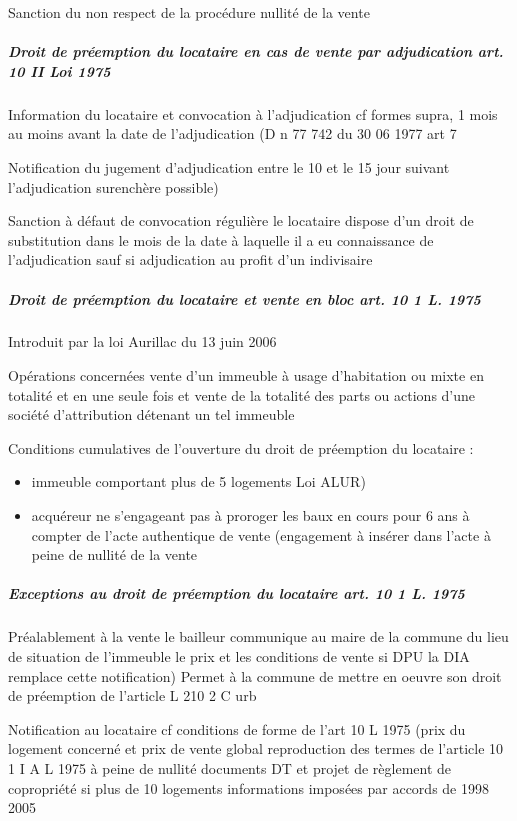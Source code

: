 \documentclass[10pt,a4paper,twoside]{article}
\begin{document}
					Sanction du non respect de la procédure nullité de la
					vente

				\subparagraph{Droit de préemption du locataire en cas de vente par adjudication art. 10 II Loi 1975}

					Information du locataire et convocation à l’adjudication cf formes
					supra, 1 mois au moins avant la date de l’adjudication (D n 77
					742 du 30 06 1977 art 7

					Notification du jugement d’adjudication entre le 10 et le 15 jour
					suivant l’adjudication surenchère possible)

					Sanction à défaut de convocation régulière le locataire dispose
					d’un droit de substitution dans le mois de la date à laquelle il a eu
					connaissance de l’adjudication sauf si adjudication au profit d’un
					indivisaire

				\subparagraph{Droit de préemption du locataire et vente en bloc art. 10 1 L. 1975}

					Introduit par la loi Aurillac du 13 juin 2006

					Opérations concernées vente d’un immeuble à usage d’habitation ou
					mixte en totalité et en une seule fois et vente de la totalité des parts ou
					actions d’une société d’attribution détenant un tel immeuble

					Conditions cumulatives de l’ouverture du droit de préemption du locataire :
					\begin{itemize}
						\item immeuble comportant plus de 5 logements Loi ALUR)

						\item acquéreur ne s’engageant pas à proroger les baux en cours pour 6 ans à compter de l’acte authentique de vente (engagement à insérer dans l’acte à peine de nullité de la vente
					\end{itemize}

				\subparagraph{Exceptions au droit de préemption du locataire art. 10 1 L. 1975}

					Préalablement à la vente le bailleur communique au maire de la
					commune du lieu de situation de l’immeuble le prix et les
					conditions de vente si DPU la DIA remplace cette notification)
					Permet à la commune de mettre en oeuvre son droit de
					préemption de l’article L 210 2 C urb

					Notification au locataire cf conditions de forme de l’art 10 L
					1975 (prix du logement concerné et prix de vente global
					reproduction des termes de l’article 10 1 I A L 1975 à peine de
					nullité documents DT et projet de règlement de copropriété
					si plus de 10 logements informations imposées par accords de
					1998 2005
\end{document}
